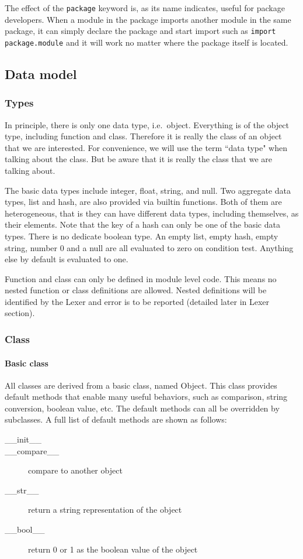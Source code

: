 \documentclass[10pt,a4paper]{article}
\begin{document}
The effect of the \lstinline$package$ keyword is, as its name indicates,
useful for package developers.
When a module in the package imports another module in the same
package, it can simply declare the package and start import such as
\lstinline$import $\verb$package.module$ and it will work no matter where
the package itself is located.

\subsection{Data model}
\subsubsection{Types}
In principle, there is only one data type, i.e.\ object.
Everything is of the object type, including function and class.
Therefore it is really the class of an object that we
are interested. For convenience, we will use the term ``data type"
when talking about the class. But be aware that it is really 
the class that we are talking about.

The basic data types include integer, float, string, and null. 
Two aggregate data types, list and hash, are also provided via builtin
functions. Both of them are heterogeneous, that is they can have
different data types, including themselves, as their elements. 
Note that the key of a hash can only be one of the basic data types.
There is no dedicate boolean type. 
An empty list, empty hash, empty string, number 0 and a null are all 
evaluated to zero on condition test. 
Anything else by default is evaluated to one.

Function and class can only be defined in module level code.
This means no nested function or class definitions are allowed.
Nested definitions will be identified by the Lexer and error is 
to be reported (detailed later in Lexer section).

\subsubsection{Class}

\paragraph{Basic class}
All classes are derived from a basic class, named Object. 
This class provides default methods that enable many useful behaviors, 
such as comparison, string conversion, boolean value, etc.
The default methods can all be overridden by subclasses.
A full list of default methods are shown as follows:
\begin{description}
\item[__init__] 
\item[__compare__] compare to another object
\item[__str__] return a string representation of the object
\item[__bool__] return 0 or 1 as the boolean value of the object
\end{description}
\end{document}
